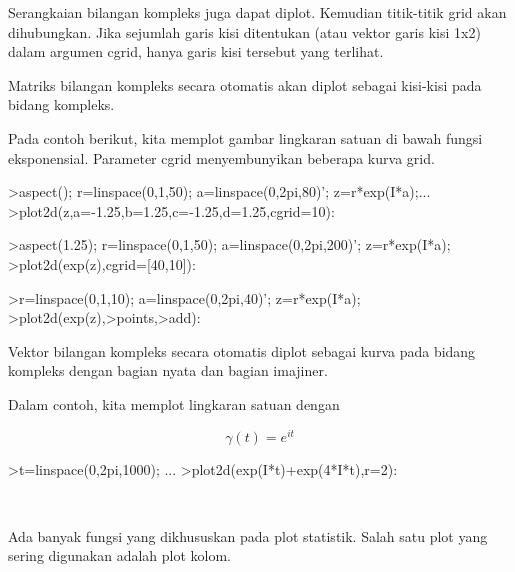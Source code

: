 \begin{eulernotebook}
\begin{eulercomment}
Serangkaian bilangan kompleks juga dapat diplot. Kemudian titik-titik
grid akan dihubungkan. Jika sejumlah garis kisi ditentukan (atau
vektor garis kisi 1x2) dalam argumen cgrid, hanya garis kisi tersebut
yang terlihat.

Matriks bilangan kompleks secara otomatis akan diplot sebagai
kisi-kisi pada bidang kompleks.

Pada contoh berikut, kita memplot gambar lingkaran satuan di bawah
fungsi eksponensial. Parameter cgrid menyembunyikan beberapa kurva
grid.
\end{eulercomment}
\begin{eulerprompt}
>aspect(); r=linspace(0,1,50); a=linspace(0,2pi,80)'; z=r*exp(I*a);...
>plot2d(z,a=-1.25,b=1.25,c=-1.25,d=1.25,cgrid=10):
\end{eulerprompt}
\begin{eulerprompt}
>aspect(1.25); r=linspace(0,1,50); a=linspace(0,2pi,200)'; z=r*exp(I*a);
>plot2d(exp(z),cgrid=[40,10]):
\end{eulerprompt}
\begin{eulerprompt}
>r=linspace(0,1,10); a=linspace(0,2pi,40)'; z=r*exp(I*a);
>plot2d(exp(z),>points,>add):
\end{eulerprompt}
\begin{eulercomment}
Vektor bilangan kompleks secara otomatis diplot sebagai kurva pada
bidang kompleks dengan bagian nyata dan bagian imajiner.

Dalam contoh, kita memplot lingkaran satuan dengan\\
\end{eulercomment}
\begin{eulerformula}
\[
\gamma(t) = e^{it}
\]
\end{eulerformula}
\begin{eulerprompt}
>t=linspace(0,2pi,1000); ...
>plot2d(exp(I*t)+exp(4*I*t),r=2):
\end{eulerprompt}
\\

\begin{eulercomment}
Ada banyak fungsi yang dikhususkan pada plot statistik. Salah satu
plot yang sering digunakan adalah plot kolom.


\end{eulercomment}
\end{eulernotebook}
